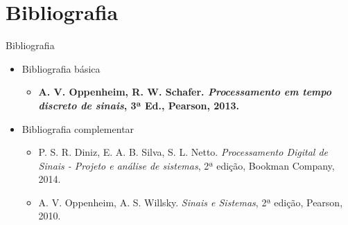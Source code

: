    \section[ slide = true]{Bibliografia}
      \begin{slide}[toc=]{Bibliografia}
         \begin{itemize}
            \item Bibliografia básica
            \begin{itemize}
               \item \textbf{A. V. Oppenheim, R. W. Schafer. \emph{Processamento 
em tempo discreto de sinais}, 3ª Ed., Pearson, 2013.}
            \end{itemize}
            \item Bibliografia complementar
            \begin{itemize}
               \item P. S. R. Diniz, E. A. B. Silva, S. L. Netto. \emph{Processamento 
               Digital de Sinais - Projeto e análise de sistemas}, 2ª edição, Bookman Company, 2014.
               \item A. V. Oppenheim, A. S. Willsky. \emph{Sinais e Sistemas}, 2ª edição, Pearson, 2010.
            \end{itemize}
         \end{itemize}
      \end{slide}

